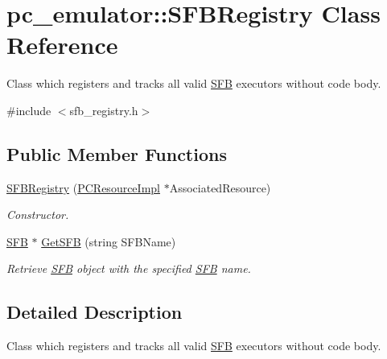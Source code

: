 \hypertarget{classpc__emulator_1_1SFBRegistry}{}\section{pc\+\_\+emulator\+:\+:S\+F\+B\+Registry Class Reference}
\label{classpc__emulator_1_1SFBRegistry}


Class which registers and tracks all valid \hyperlink{classpc__emulator_1_1SFB}{S\+FB} executors without code body.  




{\ttfamily \#include $<$sfb\+\_\+registry.\+h$>$}

\subsection*{Public Member Functions}
\begin{DoxyCompactItemize}
\item 
\hyperlink{classpc__emulator_1_1SFBRegistry_a3c26ab83ad835d9c03c43e866f68160b}{S\+F\+B\+Registry} (\hyperlink{classpc__emulator_1_1PCResourceImpl}{P\+C\+Resource\+Impl} $\ast$Associated\+Resource)\hypertarget{classpc__emulator_1_1SFBRegistry_a3c26ab83ad835d9c03c43e866f68160b}{}\label{classpc__emulator_1_1SFBRegistry_a3c26ab83ad835d9c03c43e866f68160b}

\begin{DoxyCompactList}\small\item\em Constructor. \end{DoxyCompactList}\item 
\hyperlink{classpc__emulator_1_1SFB}{S\+FB} $\ast$ \hyperlink{classpc__emulator_1_1SFBRegistry_a04425da2012a492c5e5421050bcc7ccd}{Get\+S\+FB} (string S\+F\+B\+Name)
\begin{DoxyCompactList}\small\item\em Retrieve \hyperlink{classpc__emulator_1_1SFB}{S\+FB} object with the specified \hyperlink{classpc__emulator_1_1SFB}{S\+FB} name. \end{DoxyCompactList}\end{DoxyCompactItemize}


\subsection{Detailed Description}
Class which registers and tracks all valid \hyperlink{classpc__emulator_1_1SFB}{S\+FB} executors without code body. 

